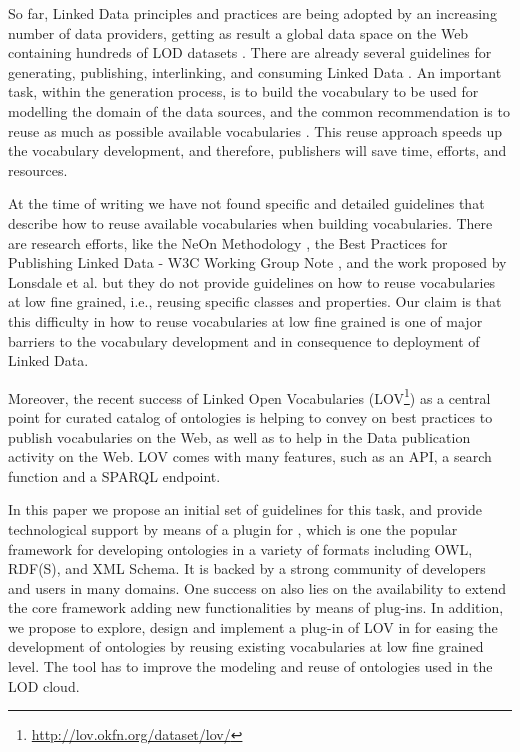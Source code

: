 So far, Linked Data principles and practices are being adopted by an increasing number of data providers, getting as result a global data space on the Web containing hundreds of LOD datasets \cite{Heath_Bizer_2011}. There are already several guidelines for generating, publishing, interlinking, and consuming Linked Data \cite{}. An important task, within the generation process, is to build the vocabulary to be used for modelling the domain of the data sources, and the common recommendation is to reuse as much as possible available vocabularies \cite{Heath_Bizer_2011,hyland14}. This reuse approach speeds up the vocabulary development, and therefore, publishers will save time, efforts, and resources. 

At the time of writing we have not found specific and detailed guidelines that describe how to reuse available vocabularies when building vocabularies. There are research efforts, like the NeOn Methodology \cite{suarezfigueroa2012ontology}, the Best Practices for Publishing Linked Data - W3C Working Group Note \cite{hyland14}, and the work proposed by Lonsdale et al. \cite{Lonsdale2010318} but they do not provide guidelines on how to reuse vocabularies at low fine grained, i.e., reusing specific classes and properties. Our claim is that this difficulty in how to reuse vocabularies at low fine grained is one of major barriers to the vocabulary development and in consequence to deployment of Linked Data.

Moreover, the recent success of Linked Open Vocabularies (LOV\footnote{\url{http://lov.okfn.org/dataset/lov/}}) as a central point for curated catalog of ontologies is helping to convey on best practices to publish vocabularies on the Web, as well as to help in the Data publication activity on the Web. LOV comes with many features, such as an API, a search function and a SPARQL endpoint.

In this paper we propose an initial set of guidelines for this task, and provide technological support by means of a plugin for \protege, which is one the popular framework for developing ontologies in a variety of formats including OWL, RDF(S), and XML Schema. It is backed by a strong community of developers and users in many domains. One success on \protege also lies on the availability to extend the core framework adding new functionalities by means of plug-ins. In addition, we propose to explore, design and implement a plug-in of LOV in \protege for easing the development of ontologies by reusing existing vocabularies at low fine grained level. The tool has to improve the modeling and reuse of ontologies used in the LOD cloud.

